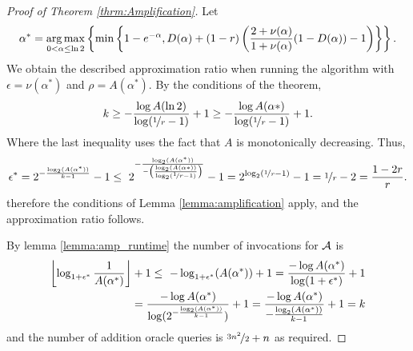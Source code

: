 \documentclass[a4paper]{article}
\begin{document}
\begin{proof}[Proof of Theorem \ref{thrm:Amplification}]
	Let $$\alpha^*  = \operatorname*{arg\,max} _{0<\alpha \leq \ln{2}} \left\{ \min \left\{ 1-e^{-\alpha},D(\alpha)+(1-r)\left( \frac{2+\nu(\alpha)}{1+\nu(\alpha)} (1-D(\alpha)) -1\right)\right\}\right\}.$$
	We obtain the described approximation ratio when running the algorithm
	with $\epsilon = \nu(\alpha^*)$ and $\rho = A(\alpha^*)$.
	By the conditions of the theorem,
	$$k \geq -\frac{\log A(\ln 2)} { \log(\nicefrac[]{1}{r} -1 ) } +1 \geq-\frac{\log A(\alpha*)} { \log(\nicefrac[]{1}{r} -1 ) } +1 .$$
	Where the last inequality uses the fact that $A$ is monotonically decreasing.  Thus,
	$$\epsilon^* = 2 ^{-\frac{\log_2 (A(\alpha^*))}{k-1}} -1 \leq \
	2 ^{-\frac{ \log_2(A(\alpha^*))}{  -\left(\frac{\log_2(A(\alpha* ))}{\log_2(\nicefrac[]{1}{r}-1)} \right) }} -1  =
	2^{\log_2(\nicefrac[]{1}{r}-1)} -1 = \nicefrac[]{1}{r}-2 = \frac{1-2r}{r} .$$
	therefore the conditions of Lemma \ref{lemma:amplification} apply,
	and the approximation ratio follows.
	
	By lemma \ref{lemma:amp_runtime} the number of invocations for $\mathcal{A}$
	is
	\begin{align*}
	\left\lfloor \log_{1+\epsilon^*} \frac{1}{A(\alpha^*)} \right\rfloor+1 \leq \
	-\log_{1+\epsilon^*} (A(\alpha^*)) +1 =
	\frac{-\log A(\alpha^*)} {\log(1+\epsilon^*)} +1 \\
	= \frac{-\log {A(\alpha^*)}} {\log(2 ^{-\frac{\log_2 (A(\alpha^*))}{k-1}} )} +1
	= \frac{-\log {A(\alpha^*)}} {-\frac{\log_2 (A(\alpha^*))}{k-1}} +1
	= k \end{align*}
	and the number of addition oracle queries is $\nicefrac[]{3n^2}{2} + n $
	as required.
	
\end{proof}





\appendix
\end{document}

